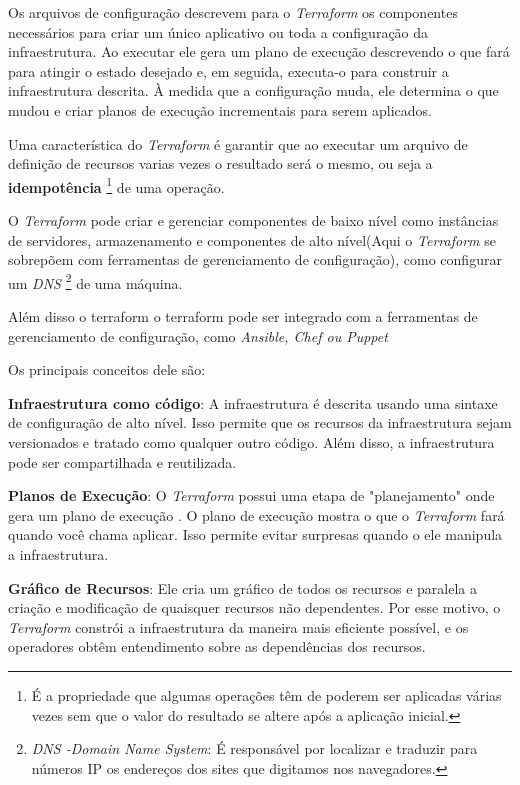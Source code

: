 Os arquivos de configuração descrevem para o \textit{Terraform} os componentes necessários para criar um único aplicativo ou toda a configuração da infraestrutura. Ao executar ele gera um plano de execução descrevendo o que fará para atingir o estado desejado e, em seguida, executa-o para construir a infraestrutura descrita. 
À medida que a configuração muda, ele determina o que mudou e criar planos de execução incrementais para serem aplicados.

Uma característica do \textit{Terraform} é garantir que ao executar um arquivo de definição de recursos varias vezes o resultado será o mesmo, ou seja a \textbf{idempotência} \footnote{É a propriedade que algumas operações têm de poderem ser aplicadas várias vezes sem que o valor do resultado se altere após a aplicação inicial.} de uma operação.

O \textit{Terraform} pode criar e gerenciar componentes de baixo nível como instâncias de servidores, armazenamento e componentes de alto nível(Aqui o \textit{Terraform} se sobrepõem com ferramentas de gerenciamento de configuração), como configurar um \textit{DNS} \footnote{\textit{DNS -Domain Name System}: É responsável por localizar e traduzir para números IP os endereços dos sites que digitamos nos navegadores.} de uma máquina.

Além disso o terraform o terraform pode ser integrado com a ferramentas de gerenciamento de configuração, como \textit{Ansible, Chef ou Puppet}

Os principais conceitos dele são:

\textbf{Infraestrutura como código}: A infraestrutura é descrita usando uma sintaxe de configuração de alto nível. Isso permite que os recursos da infraestrutura sejam versionados e tratado como qualquer outro código. Além disso, a infraestrutura pode ser compartilhada e reutilizada.

\textbf{Planos de Execução}: O \textit{Terraform} possui uma etapa de "planejamento" onde gera um plano de execução . O plano de execução mostra o que o \textit{Terraform} fará quando você chama aplicar. Isso permite evitar surpresas quando o ele manipula a infraestrutura.

\textbf{Gráfico de Recursos}: Ele cria um gráfico de todos os recursos e paralela a criação e modificação de quaisquer recursos não dependentes. Por esse motivo, o \textit{Terraform} constrói a infraestrutura da maneira mais eficiente possível, e os operadores obtêm entendimento sobre as dependências dos recursos.

